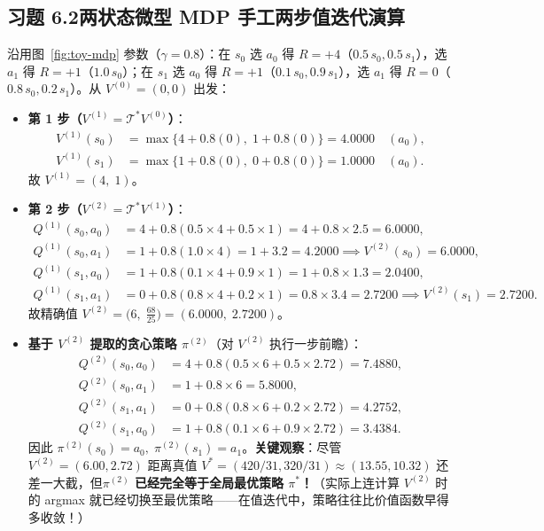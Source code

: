 \subsection*{习题 6.2\quad 两状态微型 MDP 手工两步值迭代演算}
沿用图~\ref{fig:toy-mdp} 参数（$\gamma = 0.8$）：在 $s_0$ 选 $a_0$ 得 $R=+4$（$0.5\,s_0, 0.5\,s_1$），选 $a_1$ 得 $R=+1$（$1.0\,s_0$）；在 $s_1$ 选 $a_0$ 得 $R=+1$（$0.1\,s_0, 0.9\,s_1$），选 $a_1$ 得 $R=0$（$0.8\,s_0, 0.2\,s_1$）。从 $V^{(0)} = (0, 0)$ 出发：
\begin{itemize}
  \item \textbf{第 1 步（$V^{(1)} = \mathcal{T}^* V^{(0)}$）}：
  \begin{align*}
    V^{(1)}(s_0) &= \max\{4 + 0.8(0),\; 1 + 0.8(0)\} = \mathbf{4.0000} \quad (a_0), \\
    V^{(1)}(s_1) &= \max\{1 + 0.8(0),\; 0 + 0.8(0)\} = \mathbf{1.0000} \quad (a_0).
  \end{align*}
  故 $V^{(1)} = (4,\; 1)$。
  \item \textbf{第 2 步（$V^{(2)} = \mathcal{T}^* V^{(1)}$）}：
  \begin{align*}
    Q^{(1)}(s_0, a_0) &= 4 + 0.8(0.5 \times 4 + 0.5 \times 1) = 4 + 0.8 \times 2.5 = \mathbf{6.0000}, \\
    Q^{(1)}(s_0, a_1) &= 1 + 0.8(1.0 \times 4) = 1 + 3.2 = 4.2000 \implies V^{(2)}(s_0) = \mathbf{6.0000}, \\
    Q^{(1)}(s_1, a_0) &= 1 + 0.8(0.1 \times 4 + 0.9 \times 1) = 1 + 0.8 \times 1.3 = 2.0400, \\
    Q^{(1)}(s_1, a_1) &= 0 + 0.8(0.8 \times 4 + 0.2 \times 1) = 0.8 \times 3.4 = \mathbf{2.7200} \implies V^{(2)}(s_1) = \mathbf{2.7200}.
  \end{align*}
  故精确值 $V^{(2)} = \big(6,\; \frac{68}{25}\big) = (\mathbf{6.0000},\; \mathbf{2.7200})$。
  \item \textbf{基于 $V^{(2)}$ 提取的贪心策略 $\pi^{(2)}$}（对 $V^{(2)}$ 执行一步前瞻）：
  \begin{align*}
    Q^{(2)}(s_0, a_0) &= 4 + 0.8(0.5\times 6 + 0.5\times 2.72) = \mathbf{7.4880}, \\
    Q^{(2)}(s_0, a_1) &= 1 + 0.8\times 6 = 5.8000, \\
    Q^{(2)}(s_1, a_1) &= 0 + 0.8(0.8\times 6 + 0.2\times 2.72) = \mathbf{4.2752}, \\
    Q^{(2)}(s_1, a_0) &= 1 + 0.8(0.1\times 6 + 0.9\times 2.72) = 3.4384.
  \end{align*}
  因此 $\pi^{(2)}(s_0) = a_0,\; \pi^{(2)}(s_1) = a_1$。\textbf{关键观察}：尽管 $V^{(2)} = (6.00, 2.72)$ 距离真值 $V^* = (420/31, 320/31) \approx (13.55, 10.32)$ 还差一大截，但\textbf{$\pi^{(2)}$ 已经完全等于全局最优策略 $\pi^*$！}（实际上连计算 $V^{(2)}$ 时的 argmax 就已经切换至最优策略——在值迭代中，策略往往比价值函数早得多收敛！）
\end{itemize}

